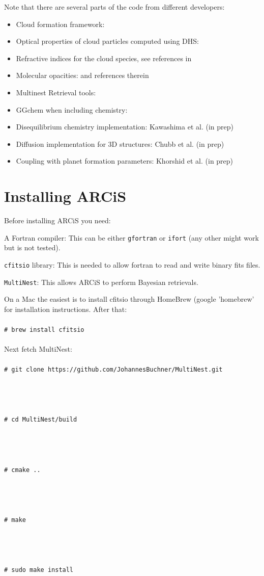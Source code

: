 \documentclass[12pt]{article}
\newcommand{\shellcmd}[1]{\\ \\ \indent\indent\texttt{\# #1}\\ \\ }
\begin{document}
Note that there are several parts of the code from different developers:
\begin{itemize}
\item Cloud formation framework: \cite{2019A&A...622A.121O}
\item Optical properties of cloud particles computed using DHS: \cite{2005A&A...432..909M, 1981ApOpt..20.3657T}
\item Refractive indices for the cloud species, see references in \cite{2020A&A...642A..28M}
\item Molecular opacities: \cite{2021A&A...646A..21C} and references therein
\item Multinest Retrieval tools: \cite{2008MNRAS.384..449F, 2009MNRAS.398.1601F, 2019OJAp....2E..10F}
\item GGchem when including chemistry: \cite{2018A&A...614A...1W}
\item Disequilibrium chemistry implementation: Kawashima et al. (in prep)
\item Diffusion implementation for 3D structures: Chubb et al. (in prep)
\item Coupling with planet formation parameters: Khorshid et al. (in prep)
\end{itemize}

\section{Installing ARCiS}

Before installing ARCiS you need:
\begin{description}
\item{A Fortran compiler:} This can be either \texttt{gfortran} or \texttt{ifort} (any other might work but is not tested).
\item{\texttt{cfitsio} library:} This is needed to allow fortran to read and write binary fits files.
\item{\texttt{MultiNest}:} This allows ARCiS to perform Bayesian retrievals.
\end{description}

On a Mac the easiest is to install cfitsio through HomeBrew (google 'homebrew' for installation instructions. After that:
%
\shellcmd{brew install cfitsio}
%
Next fetch MultiNest:
%
\shellcmd{git clone https://github.com/JohannesBuchner/MultiNest.git}
\vspace{-2cm}\\
\shellcmd{cd MultiNest/build}
\vspace{-2cm}\\
\shellcmd{cmake ..}
\vspace{-2cm}\\
\shellcmd{make}
\vspace{-2cm}\\
\shellcmd{sudo make install}
\end{document}
